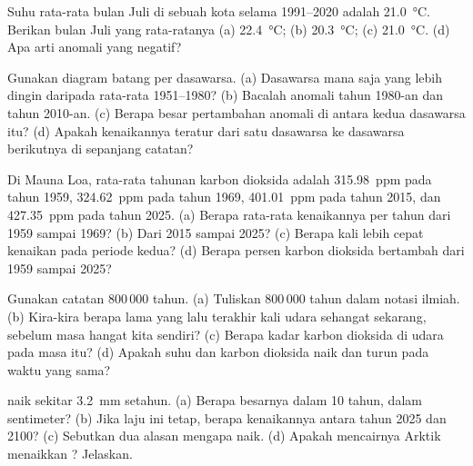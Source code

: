 \begin{exercise}[$\star$]\label{exo:g9:climate-past-and-present:4}
Suhu rata-rata bulan Juli di sebuah kota selama 1991--2020 adalah
\qty{21.0}{\degreeCelsius}. Berikan  bulan Juli yang
rata-ratanya (a) \qty{22.4}{\degreeCelsius}; (b) \qty{20.3}{\degreeCelsius};
(c) \qty{21.0}{\degreeCelsius}. (d) Apa arti anomali yang negatif?
\end{exercise}

\begin{exercise}[$\star\star$]\label{exo:g9:climate-past-and-present:5}
Gunakan diagram batang per dasawarsa. (a) Dasawarsa mana saja yang lebih
dingin daripada rata-rata 1951--1980? (b) Bacalah anomali tahun 1980-an
dan tahun 2010-an. (c) Berapa besar pertambahan anomali di antara kedua
dasawarsa itu? (d) Apakah kenaikannya teratur dari satu dasawarsa ke
dasawarsa berikutnya di sepanjang catatan?
\end{exercise}

\begin{exercise}[$\star\star$]\label{exo:g9:climate-past-and-present:6}
Di Mauna Loa, rata-rata tahunan karbon dioksida adalah \qty{315.98}{ppm}
pada tahun 1959, \qty{324.62}{ppm} pada tahun 1969, \qty{401.01}{ppm} pada
tahun 2015, dan \qty{427.35}{ppm} pada tahun 2025. (a) Berapa rata-rata
kenaikannya per tahun dari 1959 sampai 1969? (b) Dari 2015 sampai 2025?
(c) Berapa kali lebih cepat kenaikan pada periode kedua? (d) Berapa
persen karbon dioksida bertambah dari 1959 sampai 2025?
\end{exercise}

\begin{exercise}[$\star\star$]\label{exo:g9:climate-past-and-present:7}
Gunakan catatan 800\,000 tahun. (a) Tuliskan 800\,000 tahun dalam notasi
ilmiah. (b) Kira-kira berapa lama yang lalu terakhir kali udara sehangat
sekarang, sebelum masa hangat kita sendiri? (c) Berapa kadar karbon
dioksida di udara pada masa itu? (d) Apakah suhu dan karbon dioksida naik
dan turun pada waktu yang sama?
\end{exercise}

\begin{exercise}[$\star\star$]\label{exo:g9:climate-past-and-present:8}
 naik sekitar \qty{3.2}{mm} setahun. (a) Berapa besarnya
dalam 10 tahun, dalam sentimeter? (b) Jika laju ini tetap, berapa
kenaikannya antara tahun 2025 dan 2100? (c) Sebutkan dua alasan mengapa
 naik. (d) Apakah mencairnya  Arktik menaikkan
? Jelaskan.
\end{exercise}

